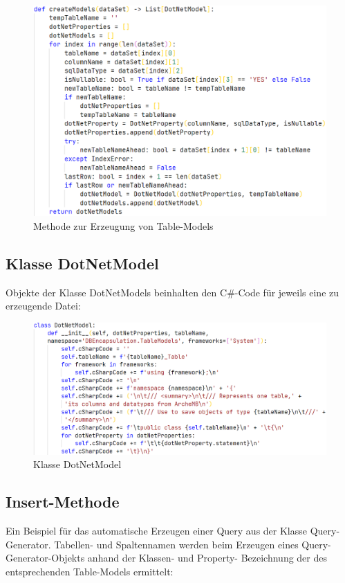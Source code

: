 \documentclass[11pt,toc=sectionentrywithoutdots, 
headheight=44pt, headings=optiontoheadandtoc, hyperfootnotes=false, hypertexnames=false]{scrartcl}
\begin{document}
 \begin{figure}[H]

	\includegraphics[scale=0.5]{modelGenerierung.PNG}
	 \caption{Methode zur Erzeugung von Table-Models}
 \end{figure}
 
  \subsection{Klasse DotNetModel}
Objekte der Klasse DotNetModels beinhalten den C\#-Code für jeweils eine zu erzeugende Datei:
 \label{fig:DotNetModel}

 \begin{figure}[H]
 \centering

	\includegraphics[scale=0.55]{dotNetModel.PNG}
	 \caption{Klasse DotNetModel}
 \end{figure}
 \clearpage
 
   \subsection{Insert-Methode}
Ein Beispiel für das automatische Erzeugen einer Query aus der Klasse Query-Generator. Tabellen- und Spaltennamen werden beim Erzeugen eines Query-Generator-Objekts anhand der Klassen- und Property- Bezeichnung der des entsprechenden Table-Models ermittelt:
 \label{fig:Insert-Methode}
\end{document}
